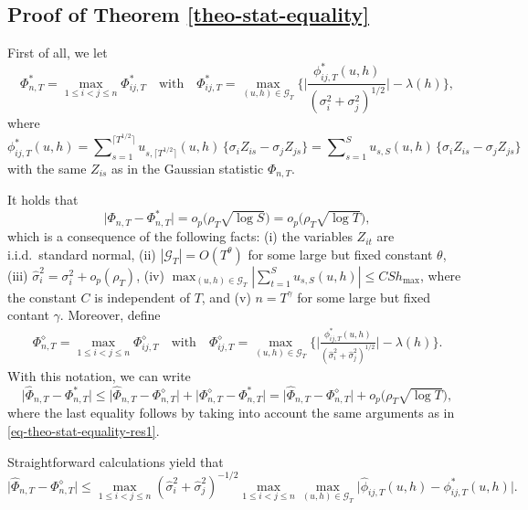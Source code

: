 \documentclass[a4paper,12pt]{article}
\begin{document}
\subsection*{Proof of Theorem \ref{theo-stat-equality}}

First of all, we let
\[ \Phi_{n,T}^* = \max_{1\le i < j \le n} \Phi_{ij,T}^* \quad \text{with} \quad \Phi_{ij,T}^* = \max_{(u,h) \in \mathcal{G}_T} \Big\{ \Big|\frac{\phi_{ij,T}^*(u,h)}{(\sigma_i^2 + \sigma_j^2)^{1/2}}\Big| - \lambda(h) \Big\}, \] 
where 
$$\phi_{ij,T}^*(u,h) = \sum\nolimits_{s=1}^{\lceil T^{1/2} \rceil} u_{s,\lceil T^{1/2} \rceil}(u,h) \, \{ \sigma_i Z_{is} - \sigma_j Z_{js} \} = \sum\nolimits_{s=1}^{S} u_{s,S}(u,h) \, \{ \sigma_i Z_{is} - \sigma_j Z_{js} \}$$
with the same $Z_{is}$ as in the Gaussian statistic $\Phi_{n,T}$. 

It holds that 
\begin{equation}\label{eq-theo-stat-equality-res1}
\big| \Phi_{n,T} - \Phi_{n,T}^* \big| = o_p \big( \rho_T \sqrt{\log S} \big) = o_p \big( \rho_T \sqrt{\log T} \big), 
\end{equation}
which is a consequence of the following facts: (i) the variables $Z_{it}$ are i.i.d.\ standard normal, (ii) $|\mathcal{G}_T| = O(T^\theta)$ for some large but fixed constant $\theta$, (iii) $\widehat{\sigma}_i^2 = \sigma_i^2 + o_p(\rho_T)$, (iv) $\max_{(u,h) \in \mathcal{G}_T} | \sum_{t=1}^S u_{s,S}(u,h) | \le C S h_{\max}$, where the constant $C$ is independent of $T$, and (v) $n = T^\gamma$ for some large but fixed contant $\gamma$.
Moreover, define
\begin{align*}
\Phi_{n,T}^{\diamond} = \max_{1\le i < j \le n}\Phi_{ij,T}^{\diamond} \quad \text{with} \quad \Phi_{ij,T}^{\diamond} = \max_{(u,h) \in \mathcal{G}_T} \Big\{ \Big|\frac{\phi^*_{ij, T}(u,h)}{(\widehat{\sigma}_i^2 + \widehat{\sigma}_j^2)^{1/2}}\Big| - \lambda(h) \Big\} .
\end{align*}
With this notation, we can write 
\begin{equation}\label{eq-theo-stat-equality-res2}
\big| \widehat{\Phi}_{n,T} - \Phi_{n,T}^* \big| \le \big| \widehat{\Phi}_{n,T} - \Phi_{n,T}^{\diamond} \big| + \big| \Phi_{n,T}^{\diamond} - \Phi_{n, T}^* \big| = \big| \widehat{\Phi}_{n,T} - \Phi_{n,T}^{\diamond} \big| + o_p \big( \rho_T \sqrt{\log T} \big), 
\end{equation}
where the last equality follows by taking into account the same arguments as in \eqref{eq-theo-stat-equality-res1}.

Straightforward calculations yield that 
\[ \big| \widehat{\Phi}_{n,T} - \Phi_{n,T}^{\diamond} \big| \le \max_{1\le i < j \le n}(\widehat{\sigma}_i^{2} + \widehat{\sigma}^2_j)^{-1/2} \max_{1\le i < j \le n}\max_{(u,h) \in \mathcal{G}_T} \big| \widehat{\phi}_{ij,T}(u,h) - \phi^*_{ij,T}(u,h) \big|. \]
\end{document}
